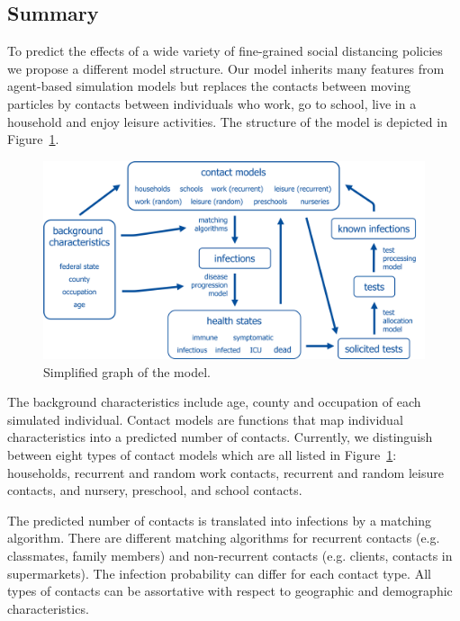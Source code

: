 \subsection{Summary}
\label{sub:model_summary}

To predict the effects of a wide variety of fine-grained social distancing policies
we propose a different model structure.
Our model inherits many features from agent-based simulation models but replaces
the contacts between moving particles by contacts between individuals who work,
go to school, live in a household and enjoy leisure activities.
The structure of the model is depicted in Figure~\ref{fig:model_graph}.

\begin{figure}[!tp]
    \centering
    \includegraphics[width=\textwidth]{../figures/model_detailed.png}
    \caption{Simplified graph of the model.}
    \label{fig:model_graph}
\end{figure}

The background characteristics include age, county and occupation of each simulated
individual. Contact models are functions that map individual characteristics into a
predicted number of contacts. Currently, we distinguish between eight types of contact
models which are all listed in Figure~\ref{fig:model_graph}: households, recurrent and
random work contacts, recurrent and random leisure contacts, and nursery, preschool, and
school contacts.

The predicted number of contacts is translated into infections by a matching algorithm.
There are different matching algorithms for recurrent contacts (e.g. classmates, family
members) and non-recurrent contacts (e.g. clients, contacts in supermarkets). The
infection probability can differ for each contact type. All types of contacts can be
assortative with respect to geographic and demographic characteristics.

